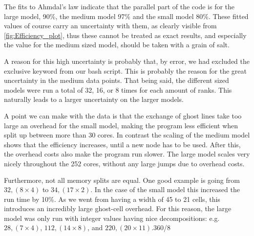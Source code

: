 \documentclass{article}
\begin{document}
The fits to Ahmdal's law indicate that the parallel part of the code is for the large model, 90\%, the medium model 97\% and the small model 80\%. These fitted values of course carry an uncertainty with them, as clearly visible from \cref{fig:Efficiency_plot}, thus these cannot be treated as exact results, and especially the value for the medium sized model, should be taken with a grain of salt.

A reason for this high uncertainty is probably that, by error, we had excluded the exclusive keyword from our bash script. This is probably the reason for the great uncertainty in the medium data points. That being said, the different sized models were run a total of 32, 16, or 8 times for each amount of ranks. This naturally leads to a larger uncertainty on the larger models.

A point we can make with the data is that the exchange of ghost lines take too large an overhead for the small model, making the program less efficient when split up between more than 30 cores. In contrast the scaling of the medium model shows that the efficiency increases, until a new node has to be used. After this, the overhead costs also make the program run slower. The large model scales very nicely throughout the 252 cores, without any large jumps due to overhead costs. 

Furthermore, not all memory splits are equal. One good example is going from $32, (8\times 4)$ to $34, (17\times 2)$. In the case of the small model this increased the run time by 10\%. As we went from having a width of 45 to 21 cells, this introduces an incredibly large ghost-cell overhead. For this reason, the large model was only run with integer values having nice decompositions: e.g. $28, (7\times 4)$, $112, (14\times 8)$, and $220, (20\times 11)$.360/8 
\end{document}
